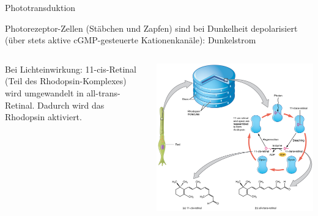 \documentclass{beamer}
\begin{document}
\begin{frame}{Phototransduktion}

Photorezeptor-Zellen (Stäbchen und Zapfen) sind bei Dunkelheit depolarisiert (über stets aktive cGMP-gesteuerte Kationenkanäle): Dunkelstrom \\[0.5cm]


\pause
\begin{columns}[c]

\begin{column}{5cm}
Bei Lichteinwirkung: 11-cis-Retinal (Teil des Rhodopsin-Komplexes) wird umgewandelt in all-trans-Retinal. Dadurch wird das Rhodopsin aktiviert.

\end{column}

\begin{column}{6cm}
\begin{center}
    \includegraphics[width=\textwidth]{1415_Retinal_Isomers.jpg}
\end{center}

\end{column}


\end{columns}



    
\end{frame}
\end{document}
